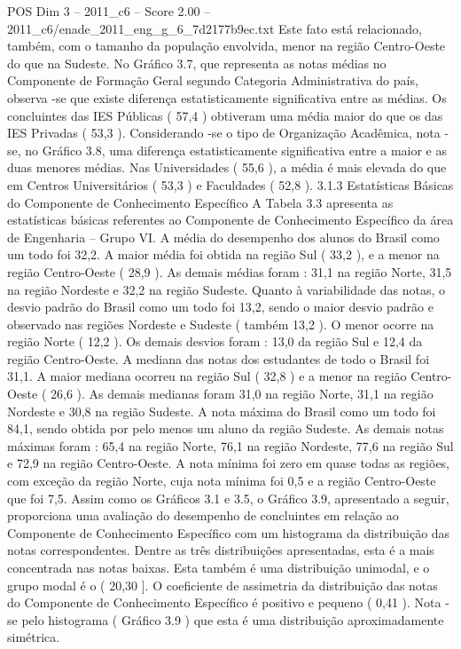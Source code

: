 \begin{textsample}{POS Dim 3 – 2011\_c6 – Score 2.00 – 2011\_c6/enade\_2011\_eng\_g\_6\_7d2177b9ec.txt}
Este fato está relacionado, também, com o tamanho da população envolvida, menor na região Centro-Oeste do que na Sudeste.
No Gráfico 3.7, que representa as notas médias no Componente de Formação Geral segundo Categoria Administrativa do país, observa -se que existe diferença estatisticamente significativa entre as médias.
Os concluintes das IES Públicas ( 57,4 ) obtiveram uma média maior do que os das IES Privadas ( 53,3 ).
Considerando -se o tipo de Organização Acadêmica, nota -se, no Gráfico 3.8, uma diferença estatisticamente significativa entre a maior e as duas menores médias.
Nas Universidades ( 55,6 ), a média é mais elevada do que em Centros Universitários ( 53,3 ) e Faculdades ( 52,8 ). 3.1.3 Estatísticas Básicas do Componente de Conhecimento Específico A Tabela 3.3 apresenta as estatísticas básicas referentes ao Componente de Conhecimento Específico da área de Engenharia – Grupo VI.
A média do desempenho dos alunos do Brasil como um todo foi 32,2.
A maior média foi obtida na região Sul ( 33,2 ), e a menor na região Centro-Oeste ( 28,9 ).
As demais médias foram : 31,1 na região Norte, 31,5 na região Nordeste e 32,2 na região Sudeste.
Quanto à variabilidade das notas, o desvio padrão do Brasil como um todo foi 13,2, sendo o maior desvio padrão e observado nas regiões Nordeste e Sudeste ( também 13,2 ).
O menor ocorre na região Norte ( 12,2 ).
Os demais desvios foram : 13,0 da região Sul e 12,4 da região Centro-Oeste.
A mediana das notas dos estudantes de todo o Brasil foi 31,1.
A maior mediana ocorreu na região Sul ( 32,8 ) e a menor na região Centro-Oeste ( 26,6 ).
As demais medianas foram 31,0 na região Norte, 31,1 na região Nordeste e 30,8 na região Sudeste.
A nota máxima do Brasil como um todo foi 84,1, sendo obtida por pelo menos um aluno da região Sudeste.
As demais notas máximas foram : 65,4 na região Norte, 76,1 na região Nordeste, 77,6 na região Sul e 72,9 na região Centro-Oeste.
A nota mínima foi zero em quase todas as regiões, com exceção da região Norte, cuja nota mínima foi 0,5 e a região Centro-Oeste que foi 7,5.
Assim como os Gráficos 3.1 e 3.5, o Gráfico 3.9, apresentado a seguir, proporciona uma avaliação do desempenho de concluintes em relação ao Componente de Conhecimento Específico com um histograma da distribuição das notas correspondentes.
Dentre as três distribuições apresentadas, esta é a mais concentrada nas notas baixas.
Esta também é uma distribuição unimodal, e o grupo modal é o ( 20,30 ].
O coeficiente de assimetria da distribuição das notas do Componente de Conhecimento Específico é positivo e pequeno ( 0,41 ).
Nota -se pelo histograma ( Gráfico 3.9 ) que esta é uma distribuição aproximadamente simétrica.

\end{textsample}
